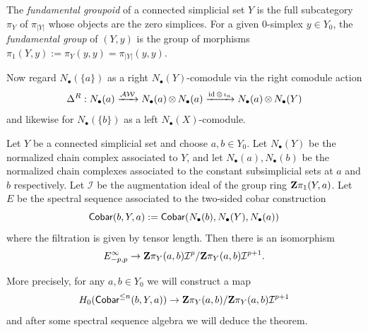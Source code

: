 \begin{defn}
The \emph{fundamental groupoid} of a connected simplicial set $Y$ is the full subcategory $\pi_Y$ of $\pi_{|Y|}$ whose objects are the zero simplices. For a given 0-simplex $y \in Y_0$, the \emph{fundamental group} of $(Y,y)$ is the group of morphisms $\pi_1(Y,y):=\pi_Y(y,y) = \pi_{|Y|}(y,y)$.
\end{defn}

Now regard $N_\bullet(\{a\})$ as a right $N_\bullet(Y)$-comodule via the right comodule action 
	\[\Delta^R: N_\bullet(a)\xrightarrow{\operatorname{\mathcal{AW}}} N_\bullet(a)\operatorname{\otimes} N_\bullet(a) \xrightarrow{\operatorname{id} \operatorname{\otimes} \iota_a} N_\bullet(a) \operatorname{\otimes} N_\bullet(Y)\]
	and likewise for $N_\bullet(\{b\})$ as a left $N_\bullet(X)$-comodule.

\begin{thm}\label{thm:stallings_generalization}
    Let $Y$ be a connected simplicial set and choose $a,b \in Y_0$. Let $N_\bullet(Y)$ be the normalized chain complex associated to $Y$, and let $N_\bullet(a), N_\bullet(b)$ be the normalized chain complexes associated to the constant subsimplicial sets at $a$ and $b$ respectively. Let $\mathcal{I}$ be the augmentation ideal of the group ring $\mathbf{Z}\pi_1(Y,a)$. Let $E$ be the spectral sequence associated to the two-sided cobar construction 
    \[\operatorname{\mathsf{Cobar}}(b,Y,a):= \operatorname{\mathsf{Cobar}}(N_\bullet(b), N_\bullet(Y), N_\bullet(a))\]
    where the filtration is given by tensor length. Then there is an isomorphism
    \[E^\infty_{-p,p}\to \mathbf{Z}\pi_Y(a,b)\mathcal{I}^p/\mathbf{Z}\pi_Y(a,b)\mathcal{I}^{p+1}.\]
\end{thm}
More precisely, for any $a, b \in Y_0$ we will construct a map
\[H_0(\operatorname{\mathsf{Cobar}}^{\leq n}(b,Y,a)) \to \mathbf{Z}\pi_Y(a,b)/\mathbf{Z}\pi_Y(a,b)\mathcal{I}^{p+1} \]
and after some spectral sequence algebra we will deduce the theorem. 

